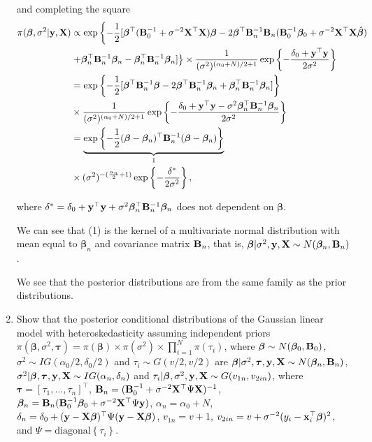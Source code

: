 \begin{enumerate}[leftmargin=*]
and completing the square
\begin{align*}
	\pi(\bm{\beta}, \sigma^2|{\bf{y}}, {\bf{X}}) & \propto \exp\left\{-\frac{1}{2}[\bm{\beta}^{\top}({\bf{B}}_0^{-1}+\sigma^{-2} {\bf{X}}^{\top}{\bf{X}})\bm{\beta}-2\bm{\beta}^{\top}{\bf{B}}_n^{-1}{\bf{B}}_n({\bf{B}}_0^{-1}\bm{\beta}_0+\sigma^{-2}{\bf{X}}^{\top}{\bf{X}}\hat{\bm{\beta}})\right.\\
	&\left.+\bm{\beta}^{\top}_n{\bf{B}}_n^{-1}\bm{\beta}_n-\bm{\beta}_n^{\top}{\bf{B}}_n^{-1}\bm{\beta}_n]\right\}\times\frac{1}{(\sigma^2)^{(\alpha_0+N)/2+1}}\exp\left\{-\frac{\delta_0+{\bf{y}}^{\top}{\bf{y}}}{2\sigma^2}\right\}\\
	&=\exp\left\{-\frac{1}{2}[\bm{\beta}^{\top}{\bf{B}}_n^{-1}\bm{\beta}-2\bm{\beta}^{\top}{\bf{B}}_n^{-1}\bm{\beta}_n+\bm{\beta}_n^{\top}{\bf{B}}_n^{-1}\bm{\beta}_n]\right\}\\
	& \times\frac{1}{(\sigma^2)^{(\alpha_0+N)/2+1}}\exp\left\{-\frac{\delta_0+{\bf{y}}^{\top}{\bf{y}}-\sigma^2\bm{\beta}_n^{\top}{\bf{B}}_n^{-1}\bm{\beta}_n}{2\sigma^2}\right\}\\
	&=\underbrace{\exp\left\{-\frac{1}{2}(\bm{\beta}-\bm{\beta}_n)^{\top}{\bf{B}}_n^{-1}(\bm{\beta}-\bm{\beta}_n)\right\}}_1\\
	&\times(\sigma^2)^{-(\frac{\alpha_n}{2}+1)}\exp\left\{-\frac{\delta^{\ast}}{2\sigma^2}\right\},
\end{align*}

where $\delta^{\ast}=\delta_0+{\bf{y}}^{\top}{\bf{y}}+\sigma^2\bm{\beta}^{\top}_n{\bf{B}}_n^{-1}\bm{\beta}_n$ does not dependent on $\bm{\beta}$.

We can see that (1) is the kernel of a multivariate normal distribution with mean equal to $\bm{\beta}_n$ and covariance matrix ${\bf{B}}_n$, that is, $\bm{\beta}|\sigma^2,{\bf{y}},{\bf{X}}\sim N(\bm{\beta}_n,{\bf{B}}_n)$. 

We see that the posterior distributions are from the same family as the prior distributions.

\item Show that the posterior conditional distributions of the Gaussian linear model with heteroskedasticity assuming independent priors $\pi(\bm{\beta},\sigma^2,\bm{\tau})=\pi(\bm{\beta})\times\pi(\sigma^2)\times\prod_{i=1}^N\pi(\tau_i)$, where $\bm{\beta} \sim N(\bm{\beta}_0, {\bf{B}}_0)$, $\sigma^2 \sim IG(\alpha_0/2, \delta_0/2)$ and $\tau_i\sim G(v/2,v/2)$ are $\bm{\beta}|\sigma^2,\bm{\tau},{\bf{y}},{\bf{X}}\sim N(\bm{\beta}_n,{\bf{B}}_n)$, $\sigma^2|\bm{\beta},\bm{\tau},{\bf{y}},{\bf{X}}\sim IG(\alpha_n,\delta_n)$ and $\tau_i|\bm{\beta},\sigma^2,{\bf{y}},{\bf{X}}\sim G(v_{1n},v_{2in})$, where $\bm{\tau}=[\tau_1,\dots,\tau_n]^{\top}$, ${\bf{B}}_n=({\bf{B}}_0^{-1}+\sigma^{-2}{{\bf{X}}}^{\top}\Psi{{\bf{X}}})^{-1}$, $\bm{\beta}_n={\bf{B}}_n({\bf{B}}_0^{-1}\bm{\beta}_0+\sigma^{-2}{\bf{X}}^{\top}\Psi{\bf{y}})$, $\alpha_n=\alpha_0+N$, $\delta_n=\delta_0+({\bf{y}}-{\bf{X}}\bm{\beta})^{\top}\Psi({\bf{y}}-{\bf{X}}\bm{\beta})$, $v_{1n}=v+1$, $v_{2in}=v+\sigma^{-2}(y_i-{\bf{x}}_i^{\top}\bm{\beta})^2$, and $\Psi=\text{diagonal}\left\{\tau_i\right\}$.


\end{enumerate}

